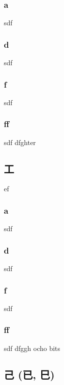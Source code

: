 \subsubsection{a}sdf
\subsubsection{d}sdf
\subsubsection{f}sdf
\subsubsection{ff}sdf
\setcounter{subsss}{\value{subsubsection}} dfghter
\subsection{\ene 工} \label{cuarentayochos} ef

\subsubsection{a}sdf
\subsubsection{d}sdf
\subsubsection{f}sdf
\subsubsection{ff}sdf
\setcounter{subsss}{\value{subsubsection}} dfggh ocho bits
\subsection{\ene  己 (已, 巳)} \label{cuarentaynueves} 
